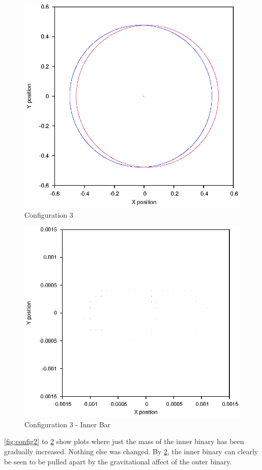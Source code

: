 \documentclass[a4paper,12pt]{article}
\begin{document}
\begin{figure}[H]
\centering
\includegraphics[width=.9\textwidth]{./2016results/003-5-001/Orbit.eps}
\caption{Configuration 3}
\label{fig:config3}
\end{figure}
\begin{figure}[H]
\centering
\includegraphics[width=.9\textwidth]{./2016results/003-5-001/Inner.eps}
\caption{Configuration 3 - Inner Bar}
\label{fig:config3i}
\end{figure}
\ref{fig:config2} to \ref{fig:config3i} show plots where just the mass of the inner binary has been gradually increased. Nothing else was changed.
By \ref{fig:config3i}, the inner binary can clearly be seen to be pulled apart by the gravitational affect of the outer binary.
\end{document}
